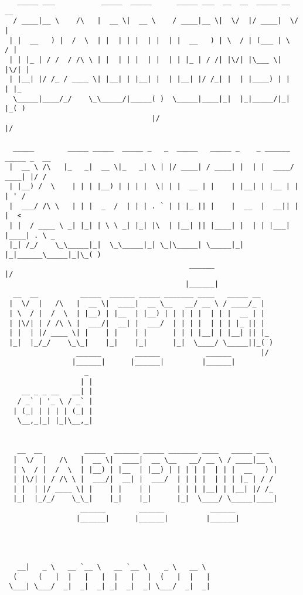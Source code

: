 \documentclass[varwidth=\maxdimen,margin=0.5cm,multi={verbatim}]{standalone}
\begin{document}
\begin{verbatim}
   _____ ___           _____  _____      _____ ___  __  __  _____ __  __
  / ____|__ \    /\   |  __ \|  __ \    / ____|__ \|  \/  |/ ____|  \/  |
 | |  __   ) |  /  \  | |  | | |  | |  | |  __   ) | \  / | (___ | \  / |
 | | |_ | / /  / /\ \ | |  | | |  | |  | | |_ | / /| |\/| |\___ \| |\/| |
 | |__| |/ /_ / ____ \| |__| | |__| |  | |__| |/ /_| |  | |____) | |  | |_
  \_____|____/_/    \_\_____/|_____( )  \_____|____|_|  |_|_____/|_|  |_( )
                                   |/                                   |/

  _____        _____ _____  _____ _   _  _____   _____ _    _ ______ _____ _  __
 |  __ \ /\   |_   _|  __ \|_   _| \ | |/ ____| / ____| |  | |  ____/ ____| |/ /
 | |__) /  \    | | | |__) | | | |  \| | |  __ | |    | |__| | |__ | |    | ' /
 |  ___/ /\ \   | | |  _  /  | | | . ` | | |_ || |    |  __  |  __|| |    |  <
 | |  / ____ \ _| |_| | \ \ _| |_| |\  | |__| || |____| |  | | |___| |____| . \ _
 |_| /_/    \_\_____|_|  \_\_____|_| \_|\_____| \_____|_|  |_|______\_____|_|\_( )
                                            ______                             |/
                                           |______|
  __  __          _____  ______ _____ _______ ____   _____ __
 |  \/  |   /\   |  __ \|  ____|  __ \__   __/ __ \ / ____/_ |
 | \  / |  /  \  | |__) | |__  | |__) | | | | |  | | |  __ | |
 | |\/| | / /\ \ |  ___/|  __| |  ___/  | | | |  | | | |_ || |
 | |  | |/ ____ \| |    | |    | |      | | | |__| | |__| || |_
 |_|  |_/_/    \_\_|    |_|    |_|      |_|  \____/ \_____||_( )
                 ______        ______           ______       |/
                |______|      |______|         |______|
                   _
                  | |
    __ _ _ __   __| |
   / _` | '_ \ / _` |
  | (_| | | | | (_| |
   \__,_|_| |_|\__,_|


   __  __          _____  ______ _____ _______ ____   _____ ___
  |  \/  |   /\   |  __ \|  ____|  __ \__   __/ __ \ / ____|__ \
  | \  / |  /  \  | |__) | |__  | |__) | | | | |  | | |  __   ) |
  | |\/| | / /\ \ |  ___/|  __| |  ___/  | | | |  | | | |_ | / /
  | |  | |/ ____ \| |    | |    | |      | | | |__| | |__| |/ /_
  |_|  |_/_/    \_\_|    |_|    |_|      |_|  \____/ \_____|____|
                  ______        ______           ______
                 |______|      |______|         |______|




   __|   _ \   __ `__ \   __ `__ \    _ \   __ \
  (     (   |  |   |   |  |   |   |  (   |  |   |
 \___| \___/  _|  _|  _| _|  _|  _| \___/  _|  _|



\end{verbatim}
\end{document}
